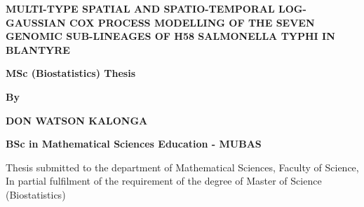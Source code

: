 \documentclass[a4paper]{thesis}
\begin{document}
\newpage

\begin{titlepage}



\begin{large}
\begin{center}
\textbf{MULTI-TYPE SPATIAL AND SPATIO-TEMPORAL LOG-GAUSSIAN COX PROCESS MODELLING 
OF THE SEVEN GENOMIC SUB-LINEAGES OF H58 SALMONELLA TYPHI 
IN BLANTYRE} 
\end{center}
\end{large}
\par \bigskip \bigskip \bigskip \bigskip


\begin{large}
\begin{center}
\bf{MSc (Biostatistics) Thesis}\\
\end{center}
\end{large}

\par \bigskip  \bigskip  \bigskip  

\begin{large}
\begin{center}
\bf{By}\\
\end{center}
\end{large}

\par \bigskip  \bigskip  \bigskip 

\begin{large}
\begin{center}
\bf{DON WATSON KALONGA}\\
\end{center}
\end{large}

\begin{large}
\begin{center}
\bf{BSc in Mathematical Sciences Education - MUBAS}\\
\end{center}
\end{large}

\par \bigskip \bigskip 

\begin{center}
Thesis submitted to the department of Mathematical Sciences, Faculty of Science, 
In partial fulfilment of the requirement of the degree of 
Master of Science (Biostatistics)\\
\end{center}


\end{titlepage}
\end{document}
